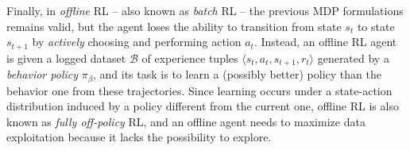 Finally, in \textit{offline} RL -- also known as \textit{batch} RL --
the previous MDP formulations remains valid, but the agent loses the
ability to transition
from state $s_t$ to state $s_{t+1}$ by \textit{actively} choosing and
performing action $a_t$. Instead, an offline RL agent is given a
logged dataset $\mathcal{B}$ of experience tuples
$\langle s_t,a_t,s_{t+1},r_t\rangle$ generated by a \textit{behavior
policy} $\pi_{\beta}$, and its task is to learn a (possibly better)
policy than the behavior one from these trajectories.
Since learning occurs under a state-action distribution induced by a
policy different from the current one, offline RL is also
known as \textit{fully off-policy} RL, and an offline agent needs to
maximize data exploitation because it lacks the possibility to
explore.
